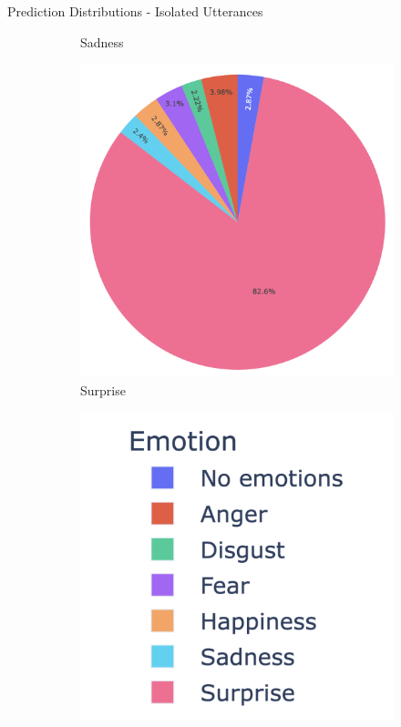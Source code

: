 \documentclass[11pt,aspectratio=169]{beamer}
\begin{document}
\begin{frame}{Prediction Distributions - Isolated Utterances}
\begin{figure}[!ht]
\begin{subfigure}{0.18\textwidth}
      \caption*{Sadness}
    \end{subfigure}\hfil 
    \begin{subfigure}{0.18\textwidth}
      \includegraphics[width=\linewidth]{figures/surprise.png}
      \caption*{Surprise}
    \end{subfigure}\hfil
    \begin{subfigure}{0.18\textwidth}
      \includegraphics[width=\linewidth]{figures/legend.png}

\end{subfigure}
\end{figure}
\end{frame}
\end{document}
